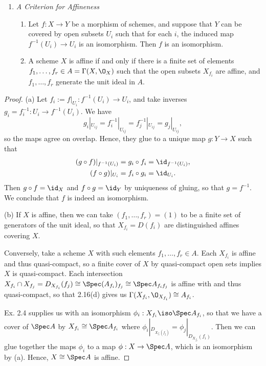 \documentclass[12pt]{amsart}
\begin{document}
\begin{enumerate}
  \item[2.17.] {
      \emph{A Criterion for Affineness}
      \begin{enumerate}
        \item Let $f:X\to Y$ be a morphism of schemes, and suppose that $Y$ can be covered by open subsets $U_i$ such that for each $i$, the induced map $f^{-1}(U_i)\to U_i$ is an isomorphism.
          Then $f$ is an isomorphism.
        \item A scheme $X$ is affine if and only if there is a finite set of elements $f_1,\ldots, f_r\in A=\Gamma(X,\O_X)$ such that the open subsets $X_{f_i}$ are affine, and $f_1,\ldots, f_r$ generate the unit ideal in $A$.
      \end{enumerate}
    }
\end{enumerate}

\begin{proof}
  (a) Let $f_i:=f|_{U_i}:f^{-1}(U_i)\to U_i$, and take inverses $g_i=f_i^{-1}:U_i\to f^{-1}(U_i)$.
  We have
  \[
    g_i|_{U_{ij}}=f_i^{-1}|_{U_{ij}}= f_j^{-1}|_{U_{ij}}=g_j|_{U_{ij}},
  \] 
  so the maps agree on overlap.
  Hence, they glue to a unique map $g:Y\to X$ such that 
  \begin{align*}
    (g\circ f)|_{f^{-1}(U_i)}
      &=g_i\circ f_i =\id_{f^{-1}(U_i)}, \\
    (f\circ g)|_{U_i} 
      &=f_i\circ g_i=\id_{U_i}.
  \end{align*}
  Then $g\circ f=\id_X$ and $f\circ g=\id_Y$ by uniqueness of gluing, so that $g=f^{-1}$.
  We conclude that $f$ is indeed an isomorphism.

  (b) If $X$ is affine, then we can take $(f_1,\ldots, f_r)=(1)$ to be a finite set of generators of the unit ideal, so that $X_{f_i}=D(f_i)$ are distinguished affines covering $X$.
  
  Conversely, take a scheme $X$ with such elements $f_1,\ldots, f_r\in A$.
  Each $X_{f_i}$ is affine and thus quasi-compact, so a finite cover of $X$ by quasi-compact open sets implies $X$ is quasi-compact.
  Each intersection $X_{f_i}\cap X_{f_j}=D_{X_{f_i}}(f_j)\cong \Spec (A_{f_i})_{f_j}\cong \Spec A_{f_if_j}$ is affine with and thus quasi-compact, so that 2.16(d) gives us $\Gamma(X_{f_i},\O_{X_{f_i}})\cong A_{f_i}$.

  Ex. 2.4 supplies us with an isomorphism $\phi_i:X_{f_i}\iso\Spec A_{f_i}$, so that we have a cover of $\Spec A$ by $X_{f_i}\cong \Spec A_{f_i}$ where $\phi_i|_{D_{X_{f_i}(f_j)}}=\phi_j|_{D_{X_{f_j}}(f_i)}$.
  Then we can glue together the maps $\phi_i$ to a map $\phi:X\to \Spec A$, which is an isomorphism by (a).
  Hence, $X\cong \Spec A$ is affine.
\end{proof}
\end{document}
